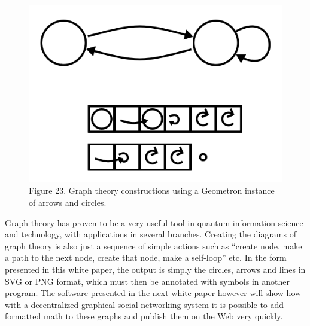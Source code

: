 \documentclass[11pt]{article}
\begin{document}
\begin{figure}

\includegraphics[width=\linewidth]{figures/figure23_graphtheory.png}

\caption{Figure 23. Graph theory constructions using a Geometron instance of arrows and circles.}
\end{figure}




   Graph theory has proven to be a very useful tool in quantum information science and technology, with applications in several branches.  Creating the diagrams of graph theory is also just a sequence of simple actions such as ``create node, make a path to the next node, create that node, make a self-loop'' etc.  In the form presented in this white paper, the output is simply the circles, arrows and lines in SVG or PNG format, which must then be annotated with symbols in another program.  The software presented in the next white paper however will show how with a decentralized graphical social networking system it is possible to add formatted math to these graphs and publish them on the Web very quickly. 
\end{document}
